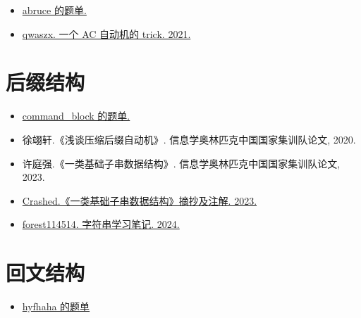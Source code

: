 \begin{itemize}
    \item \href{https://www.luogu.com.cn/training/60465}{abruce 的题单.}
    \item \href{https://www.luogu.com.cn/article/h9l7fbcn}{qwaszx. 一个 AC 自动机的 trick. 2021.}
\end{itemize}


\section{后缀结构}

\begin{itemize}
    \item \href{https://www.luogu.com.cn/training/5322}{command\_block 的题单.}
    \item 徐翊轩.《浅谈压缩后缀自动机》. 信息学奥林匹克中国国家集训队论文, 2020.
    \item 许庭强.《一类基础子串数据结构》. 信息学奥林匹克中国国家集训队论文, 2023. 
    \item \href{https://www.cnblogs.com/crashed/p/17382894.html}{Crashed.《一类基础子串数据结构》摘抄及注解. 2023.}
    \item \href{https://www.luogu.com/article/3honl41j}{forest114514. 字符串学习笔记. 2024.}
\end{itemize}



\section{回文结构}

\begin{itemize}
    \item \href{https://www.luogu.com.cn/training/22566}{hyfhaha 的题单}
\end{itemize}



    